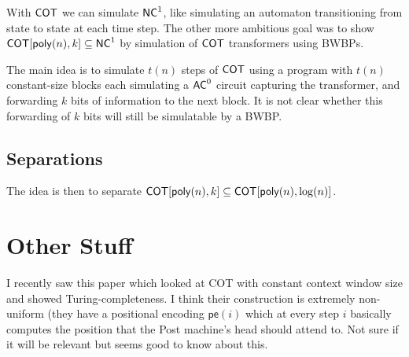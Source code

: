 \documentclass{article}
\begin{document}
With $\mathsf{COT}$ we can simulate $\mathsf{NC}^1$, like simulating an automaton transitioning from state to state at each time step. 
The other more ambitious goal was to show $\mathsf{COT}[\mathsf{poly}(n),k] \subseteq \mathsf{NC}^1$ by simulation of $\mathsf{COT}$ transformers using BWBPs. 

The main idea is to simulate $t(n)$ steps of $\mathsf{COT}$ using a program with $t(n)$ constant-size blocks each simulating a $\mathsf{AC}^0$ circuit capturing the transformer, and forwarding $k$ bits of information to the next block. 
It is not clear whether this forwarding of $k$ bits will still be simulatable by a BWBP.

\subsection{Separations}

The idea is then to separate $\mathsf{COT}[\mathsf{poly}(n),k] \subseteq \mathsf{COT}[\mathsf{poly}(n),\log(n)]$.

\section{Other Stuff}

I recently saw this paper \citep{li2025constant} which looked at COT with constant context window size and showed Turing-completeness. 
I think their construction is extremely non-uniform (they have a positional encoding $\mathsf{pe}(i)$ which at every step $i$ basically computes the position that the Post machine's head should attend to. 
Not sure if it will be relevant but seems good to know about this.



\end{document}
